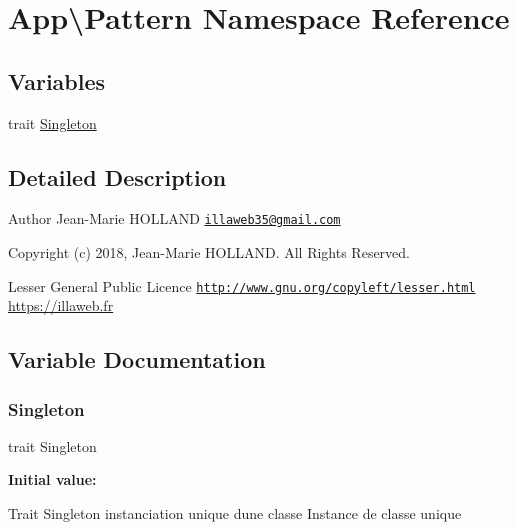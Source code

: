 \hypertarget{namespace_app_1_1_pattern}{}\section{App\textbackslash{}Pattern Namespace Reference}
\label{namespace_app_1_1_pattern}
\subsection*{Variables}
\begin{DoxyCompactItemize}
\item 
trait \hyperlink{namespace_app_1_1_pattern_a90c7994df18fc2d358849f9a46502bc1}{Singleton}
\end{DoxyCompactItemize}


\subsection{Detailed Description}
\begin{DoxyAuthor}{Author}
Jean-\/\+Marie H\+O\+L\+L\+A\+ND \href{mailto:illaweb35@gmail.com}{\tt illaweb35@gmail.\+com} 
\end{DoxyAuthor}
\begin{DoxyCopyright}{Copyright}
(c) 2018, Jean-\/\+Marie H\+O\+L\+L\+A\+ND. All Rights Reserved.
\end{DoxyCopyright}
Lesser General Public Licence \href{http://www.gnu.org/copyleft/lesser.html}{\tt http\+://www.\+gnu.\+org/copyleft/lesser.\+html} \hyperlink{}{https\+://illaweb.\+fr}

\subsection{Variable Documentation}
\mbox{\label{namespace_app_1_1_pattern_a90c7994df18fc2d358849f9a46502bc1}} 
\subsubsection{\texorpdfstring{Singleton}{Singleton}}
{\footnotesize\ttfamily trait Singleton}

{\bfseries Initial value\+:}
Trait Singleton instanciation unique d\textquotesingle{}une classe Instance de classe unique 